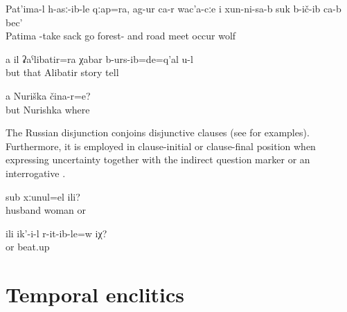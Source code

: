 \begin{exe}
	\ex	\label{ex:‎Patima took a sack and went into the forest and on the way she met a wolf minor}
	\gll	Pat'ima-l	h-asː-ib-le	qːap=ra,	ag-ur	ca-r	wac'a-cːe	i xun-ni-sa-b	suk	b-ič-ib	ca-b	bec'\\
		Patima	-take	sack	go		forest-	and	road	meet	occur		wolf\\
	\glt	{}

	\ex	\label{ex:and / but you also already told the story of Alibatir minor}
	\gll	a	il	ʡaˁlibatir=ra	χabar	b-urs-ib=de=q'al	u-l\\
		but	that	Alibatir	story	tell	\\
	\glt	{}

	\ex	\label{ex:‎And Nurishka, where is she minor}
	\gll	a	Nuriška	čina-r=e?\\
		but	Nurishka	where\\
	\glt	{}
\end{exe}

The Russian disjunction   conjoins disjunctive clauses (see  for examples). Furthermore, it is employed in clause-initial or clause-final position when expressing uncertainty together with the indirect question marker  or an interrogative  .

\begin{exe}
	\ex	\label{ex:‎Or this is a married couple minor}
	\gll	sub	xːunul=el	ili?\\
		husband	woman	or\\
	\glt	{}

	\ex	\label{ex:Or did he beat her minor}
	\gll	ili	ik'-i-l	r-it-ib-le=w	iχ?\\
		or		beat.up	\\
	\glt	{}
\end{exe}

\section{Temporal enclitics}
\label{sec:Temporal enclitics}

